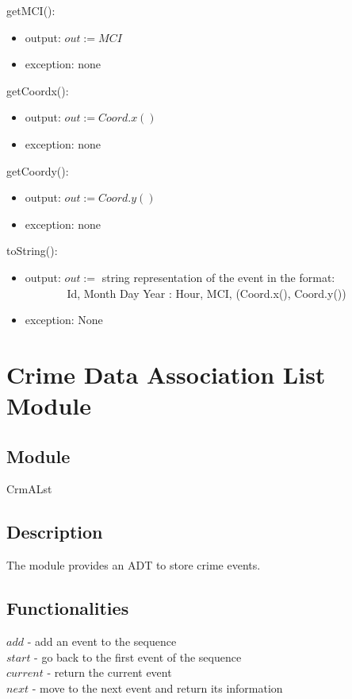 \documentclass[12pt]{article}
\begin{document}
\noindent getMCI():
\begin{itemize}
\item output: $out := MCI$
\item exception: none
\end{itemize}

\noindent getCoordx():
\begin{itemize}
\item output: $out := Coord.x()$
\item exception: none
\end{itemize}

\noindent getCoordy():
\begin{itemize}
\item output: $out := Coord.y()$
\item exception: none
\end{itemize}

\noindent toString():
\begin{itemize}
\item output: $out := $ string representation of the event in the format: 
\\$~~~~~~~~~~~~~~~~~$Id, Month Day Year : Hour, MCI, (Coord.x(), Coord.y())
\item exception: None
\end{itemize}


\newpage

\section* {Crime Data Association List Module}

\subsection*{Module}

CrmALst

\subsection*{Description}
The module provides an ADT to store crime events.

\subsection*{Functionalities}
$add$ - add an event to the sequence\\
$start$ - go back to the first event of the sequence\\
$current$ - return the current event\\
$next$ - move to the next event and return its information
\end{document}
